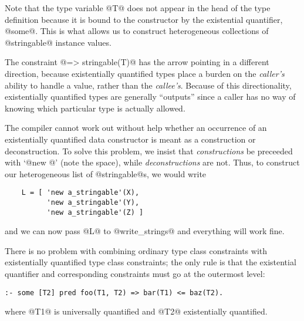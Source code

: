 Note that the type variable @T@ does not appear in the head of the type
definition because it is bound to the constructor by the existential
quantifier, @some@.  This is what allows us to construct heterogeneous
collections of @stringable@ instance values.

The constraint @=> stringable(T)@ has the arrow pointing in a different
direction, because existentially quantified types place a burden on the
\emph{caller's} ability to handle a value, rather than the
\emph{callee's}.  Because of this directionality, existentially
quantified types are generally ``outputs'' since a caller has no way of
knowing which particular type is actually allowed.

The compiler cannot work out without help  whether an occurrence of an existentially
quantified data constructor is meant as a construction or
deconstruction.  To solve this problem, we insist that
\emph{constructions} be preceeded with `@new @' (note the space), while
\emph{deconstructions} are not.  Thus, to construct our heterogeneous
list of @stringable@s, we would write
\begin{verbatim}
    L = [ 'new a_stringable'(X),
          'new a_stringable'(Y),
          'new a_stringable'(Z) ]
\end{verbatim}
and we can now pass @L@ to @write_strings@ and everything will work
fine.

There is no problem with combining ordinary type class constraints with
existentially quantified type class constraints; the only rule is that
the existential quantifier and corresponding constraints must go at the
outermost level:
\begin{verbatim}
:- some [T2] pred foo(T1, T2) => bar(T1) <= baz(T2).
\end{verbatim}
where @T1@ is universally quantified and @T2@ existentially quantified.
